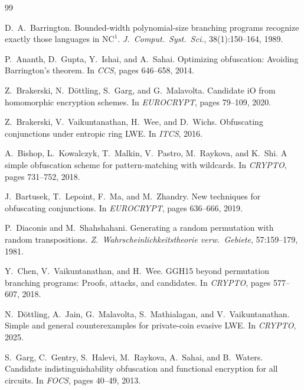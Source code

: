 \documentclass[11pt]{article}
\begin{document}

\clearpage

\begin{thebibliography}{99}

D.~A.~Barrington.
\newblock Bounded-width polynomial-size branching programs recognize exactly
  those languages in $\mathrm{NC}^1$.
\newblock \emph{J.~Comput.~Syst.~Sci.}, 38(1):150--164, 1989.

P.~Ananth, D.~Gupta, Y.~Ishai, and A.~Sahai.
\newblock Optimizing obfuscation: Avoiding Barrington's theorem.
\newblock In \emph{CCS}, pages 646--658, 2014.

Z.~Brakerski, N.~D{\"o}ttling, S.~Garg, and G.~Malavolta.
\newblock Candidate iO from homomorphic encryption schemes.
\newblock In \emph{EUROCRYPT}, pages 79--109, 2020.

Z.~Brakerski, V.~Vaikuntanathan, H.~Wee, and D.~Wichs.
\newblock Obfuscating conjunctions under entropic ring LWE.
\newblock In \emph{ITCS}, 2016.

A.~Bishop, L.~Kowalczyk, T.~Malkin, V.~Pastro, M.~Raykova, and K.~Shi.
\newblock A simple obfuscation scheme for pattern-matching with wildcards.
\newblock In \emph{CRYPTO}, pages 731--752, 2018.

J.~Bartusek, T.~Lepoint, F.~Ma, and M.~Zhandry.
\newblock New techniques for obfuscating conjunctions.
\newblock In \emph{EUROCRYPT}, pages 636--666, 2019.

P.~Diaconis and M.~Shahshahani.
\newblock Generating a random permutation with random transpositions.
\newblock \emph{Z.~Wahrscheinlichkeitstheorie verw.~Gebiete}, 57:159--179, 1981.

Y.~Chen, V.~Vaikuntanathan, and H.~Wee.
\newblock GGH15 beyond permutation branching programs: Proofs, attacks, and
  candidates.
\newblock In \emph{CRYPTO}, pages 577--607, 2018.

N.~D{\"o}ttling, A.~Jain, G.~Malavolta, S.~Mathialagan, and
  V.~Vaikuntanathan.
\newblock Simple and general counterexamples for private-coin evasive LWE.
\newblock In \emph{CRYPTO}, 2025.

S.~Garg, C.~Gentry, S.~Halevi, M.~Raykova, A.~Sahai, and B.~Waters.
\newblock Candidate indistinguishability obfuscation and functional encryption
  for all circuits.
\newblock In \emph{FOCS}, pages 40--49, 2013.


\end{thebibliography}
\end{document}
